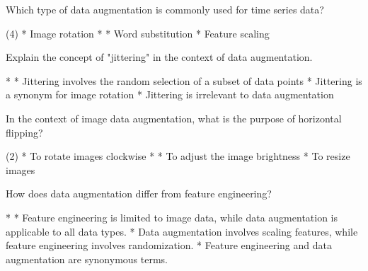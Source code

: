 \documentclass[10pt]{extarticle}
\begin{document}
\begin{exercise}
    Which type of data augmentation is commonly used for time series data?
    \begin{choice}(4)
        * Image rotation
        * 
        * Word substitution
        * Feature scaling
    \end{choice}
\end{exercise}
\begin{solution}
\end{solution}

\begin{exercise}
    Explain the concept of "jittering" in the context of data augmentation.
    \begin{choice}
        * 
        * Jittering involves the random selection of a subset of data points
        * Jittering is a synonym for image rotation
        * Jittering is irrelevant to data augmentation
    \end{choice}
\end{exercise}
\begin{solution}
\end{solution}

\begin{exercise}
    In the context of image data augmentation, what is the purpose of horizontal flipping?
    \begin{choice} (2)
        * To rotate images clockwise
        * 
        * To adjust the image brightness
        * To resize images
    \end{choice}
\end{exercise}
\begin{solution}
\end{solution}

\begin{exercise}
    How does data augmentation differ from feature engineering?
    \begin{choice}
        * 
        * Feature engineering is limited to image data, while data augmentation is applicable to all data types.
        * Data augmentation involves scaling features, while feature engineering involves randomization.
        * Feature engineering and data augmentation are synonymous terms.
    \end{choice}
\end{exercise}
\begin{solution}
\end{solution}
\end{document}

